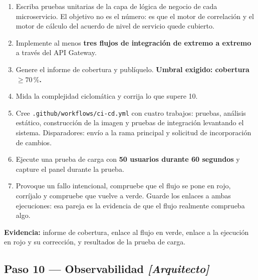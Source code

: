 \documentclass[11pt,a4paper]{article}
\newcommand{\paso}[1]{\subsection{#1}}
\begin{document}
	\begin{enumerate}[leftmargin=*,itemsep=4pt]
		\item Escriba pruebas unitarias de la capa de lógica de negocio de cada microservicio. El objetivo no es el número: es que el motor de correlación y el motor de cálculo del acuerdo de nivel de servicio quede cubierto.
		\item Implemente al menos \textbf{tres flujos de integración de extremo a extremo} a través del API Gateway.
		\item Genere el informe de cobertura y publíquelo. \textbf{Umbral exigido: cobertura $\geq 70\,\%$.}
		\item Mida la complejidad ciclomática y corrija lo que supere 10.
		\item Cree \texttt{.github/workflows/ci-cd.yml} con cuatro trabajos: pruebas, análisis estático, construcción de la imagen y pruebas de integración levantando el sistema. Disparadores: envío a la rama principal y solicitud de incorporación de cambios.
		\item Ejecute una prueba de carga con \textbf{50 usuarios durante 60 segundos} y capture el panel durante la prueba.
		\item Provoque un fallo intencional, compruebe que el flujo se pone en rojo, corríjalo y compruebe que vuelve a verde. Guarde los enlaces a ambas ejecuciones: esa pareja es la evidencia de que el flujo realmente comprueba algo.
	\end{enumerate}
	
	\textbf{Evidencia:} informe de cobertura, enlace al flujo en verde, enlace a la ejecución en rojo y su corrección, y resultados de la prueba de carga.
	
	\paso{Paso 10 --- Observabilidad \emph{[Arquitecto]}}
	
\end{document}
